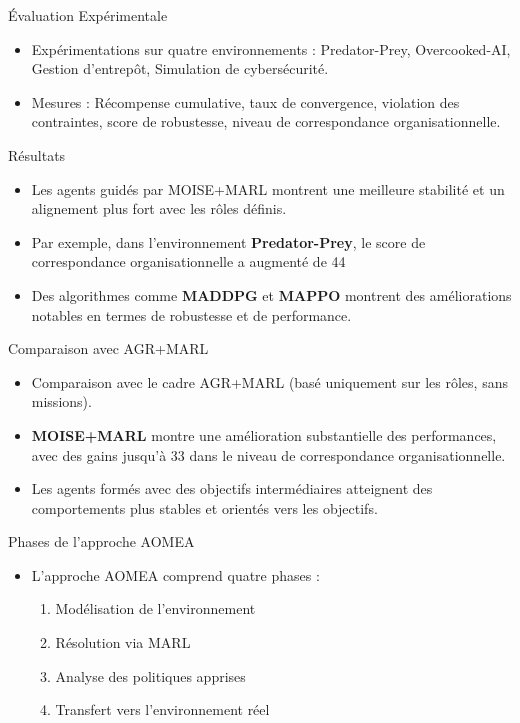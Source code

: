 \documentclass{beamer}
\begin{document}
\begin{frame}{Évaluation Expérimentale}
    \begin{itemize}
        \item Expérimentations sur quatre environnements : Predator-Prey, Overcooked-AI, Gestion d'entrepôt, Simulation de cybersécurité.
        \item Mesures : Récompense cumulative, taux de convergence, violation des contraintes, score de robustesse, niveau de correspondance organisationnelle.
    \end{itemize}
\end{frame}

\begin{frame}{Résultats}
    \begin{itemize}
        \item Les agents guidés par MOISE+MARL montrent une meilleure stabilité et un alignement plus fort avec les rôles définis.
        \item Par exemple, dans l'environnement \textbf{Predator-Prey}, le score de correspondance organisationnelle a augmenté de 44%
        \item Des algorithmes comme \textbf{MADDPG} et \textbf{MAPPO} montrent des améliorations notables en termes de robustesse et de performance.
    \end{itemize}
\end{frame}

\begin{frame}{Comparaison avec AGR+MARL}
    \begin{itemize}
        \item Comparaison avec le cadre AGR+MARL (basé uniquement sur les rôles, sans missions).
        \item \textbf{MOISE+MARL} montre une amélioration substantielle des performances, avec des gains jusqu'à 33 dans le niveau de correspondance organisationnelle.
        \item Les agents formés avec des objectifs intermédiaires atteignent des comportements plus stables et orientés vers les objectifs.
    \end{itemize}
\end{frame}

\begin{frame}{Phases de l'approche AOMEA}
    \begin{itemize}
        \item L'approche AOMEA comprend quatre phases :
        \begin{enumerate}
            \item Modélisation de l'environnement
            \item Résolution via MARL
            \item Analyse des politiques apprises
            \item Transfert vers l'environnement réel
        \end{enumerate}
    \end{itemize}
\end{frame}
\end{document}
